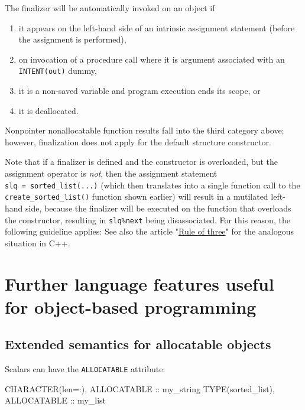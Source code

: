 \documentclass[
]{scrartcl}
\newenvironment{Shaded}{}{}
\newcommand{\DataTypeTok}[1]{\textcolor[rgb]{0.56,0.13,0.00}{#1}}
\newcommand{\NormalTok}[1]{#1}
\providecommand{\tightlist}{%
  \setlength{\itemsep}{0pt}\setlength{\parskip}{0pt}}
\begin{document}
The finalizer will be automatically invoked on an object if

\begin{enumerate}
\def\labelenumi{\arabic{enumi}.}
\tightlist
\item
  it appears on the left-hand side of an intrinsic assignment statement
  (before the assignment is performed),
\item
  on invocation of a procedure call where it is argument associated with
  an \texttt{INTENT(out)} dummy,
\item
  it is a non-saved variable and program execution ends its scope, or
\item
  it is deallocated.
\end{enumerate}

Nonpointer nonallocatable function results fall into the third category
above; however, finalization does not apply for the default structure
constructor.

Note that if a finalizer is defined and the constructor is overloaded,
but the assignment operator is \emph{not}, then the assignment statement
\texttt{slq\ =\ sorted\_list(...)} (which then translates into a single
function call to the \texttt{create\_sorted\_list()} function shown
earlier) will result in a mutilated left-hand side, because the
finalizer will be executed on the function that overloads the
constructor, resulting in \texttt{slq\%next} being disassociated. For
this reason, the following guideline applies: See also the article
"\href{https://en.wikipedia.org/wiki/Rule_of_three_(C\%2B\%2B_programming)}{Rule
of three}" for the analogous situation in C++.

\section{Further language features useful for object-based
programming}\label{further-language-features-useful-for-object-based-programming}

\subsection{Extended semantics for allocatable
objects}\label{extended-semantics-for-allocatable-objects}

Scalars can have the \texttt{ALLOCATABLE} attribute:

\begin{Shaded}
\begin{Highlighting}[]
\DataTypeTok{CHARACTER(len=:)}\NormalTok{, }\DataTypeTok{ALLOCATABLE} \DataTypeTok{::}\NormalTok{ my\_string}
\DataTypeTok{TYPE(sorted\_list)}\NormalTok{, }\DataTypeTok{ALLOCATABLE} \DataTypeTok{::}\NormalTok{ my\_list}
\end{Highlighting}
\end{Shaded}
\end{document}
